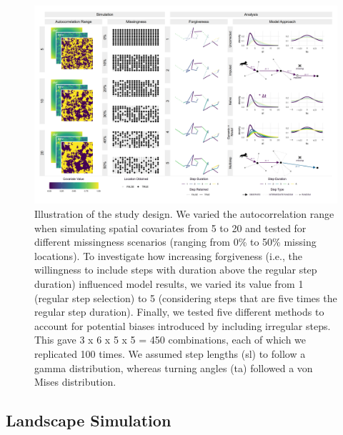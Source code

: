 \documentclass[../FinalThesis.tex]{subfiles}
\begin{document}
\begin{figure}[htpb]
  \begin{center}
  \includegraphics[width = \textwidth]{Figures/Design.png}
  \caption{Illustration of the study design. We varied the autocorrelation range
  when simulating spatial covariates from 5 to 20 and tested for different
  missingness scenarios (ranging from 0\% to 50\% missing locations). To
  investigate how increasing forgiveness (i.e., the willingness to include steps
  with duration above the regular step duration) influenced model results, we
  varied its value from 1 (regular step selection) to 5 (considering steps that
  are five times the regular step duration). Finally, we tested five different
  methods to account for potential biases introduced by including irregular
  steps. This gave 3 x 6 x 5 x 5 = 450 combinations, each of which we replicated
  100 times. We assumed step lengths (sl) to follow a gamma distribution,
  whereas turning angles (ta) followed a von Mises distribution.}
  \label{Design}
  \end{center}
\end{figure}

\subsection{Landscape Simulation}
\end{document}
